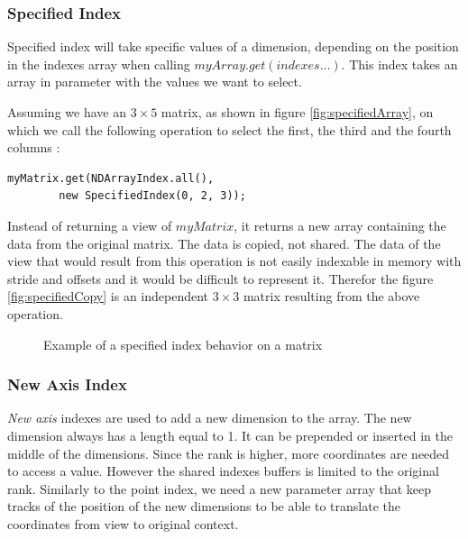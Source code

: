 \subsubsection{Specified Index}

Specified index will take specific values of a dimension, depending on the position in the indexes array when calling $myArray.get(indexes...)$. This index takes an array in parameter with the values we want to select.

Assuming we have an $3\times 5$ matrix, as shown in figure \ref{fig:specifiedArray}, on which we call the following operation to select the first, the third and the fourth columns :

\begin{lstlisting}[style=nonumbers]
	myMatrix.get(NDArrayIndex.all(),
		new SpecifiedIndex(0, 2, 3));
\end{lstlisting}

Instead of returning a view of $myMatrix$, it returns a new array containing the data from the original matrix. The data is copied, not shared. The data of the view that would result from this operation is not easily indexable in memory with stride and offsets and it would be difficult to represent it. Therefor the figure \ref{fig:specifiedCopy} is an independent $3\times 3$ matrix resulting from the above operation.

\begin{figure}[!h]
	\centering
	\qquad
	\hfill
	\caption{Example of a specified index behavior on a matrix}
\end{figure}


\subsubsection{New Axis Index}
\textit{New axis} indexes are used to add a new dimension to the array. The new dimension always has a length equal to 1. It can be prepended or inserted in the middle of the dimensions.
Since the rank is higher, more coordinates are needed to access a value. However the shared indexes buffers is limited to the original rank. Similarly to the point index, we need a new parameter array that keep tracks of the position of the new dimensions to be able to  translate the coordinates from view to original context.


